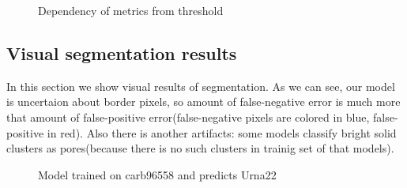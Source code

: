 \documentclass[review]{elsarticle}
\begin{document}
\begin{figure}[h]
	\caption{Dependency of metrics from threshold}
	\label{Results:threshold_iou}
\end{figure}


\subsection{Visual segmentation results}

In this section we show visual results of segmentation. 
As we can see, our model is uncertaion about border pixels, so 
amount of false-negative error is much more that amount of false-positive error(false-negative pixels are colored in blue, false-positive in red).
Also there is another artifacts: some models classify bright solid clusters as pores(because there is no such clusters in trainig set of that models).

\begin{figure}[h]
	\caption{Model trained on carb96558 and predicts Urna22}
	\label{Results:visual_bright_cluster}
\end{figure}
\end{document}
